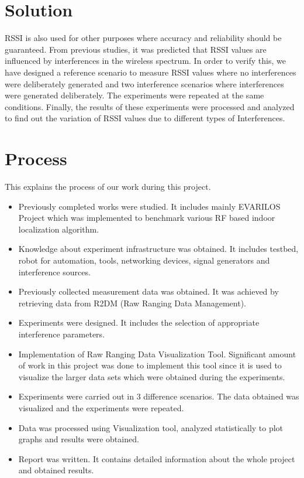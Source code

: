 \documentclass[11pt,a4paper,headinclude,footinclude,chapterprefix=on]{scrreprt}
\begin{document}
\section{Solution} RSSI is also used for other purposes where accuracy and reliability should be guaranteed. From previous studies, it was predicted that RSSI values are influenced by interferences in the wireless spectrum. In order to verify this, we have designed a reference scenario to measure RSSI values where no interferences were deliberately generated and two interference scenarios where interferences were generated deliberately. The experiments were repeated at the same conditions. Finally, the results of these experiments were processed and analyzed to find out the variation of RSSI values due to different types of Interferences.

\section{Process} This explains the process of our work during this project. 
\begin{itemize}
	\item Previously completed works were studied. It includes mainly EVARILOS Project which was implemented to benchmark various RF based indoor localization algorithm. 
	\item Knowledge about experiment infrastructure was obtained. It includes testbed, robot for automation, tools, networking devices, signal generators and interference sources. 
	\item Previously collected measurement data was obtained. It was achieved by retrieving data from R2DM (Raw Ranging Data Management). 
	\item Experiments were designed. It includes the selection of appropriate interference parameters. 
	\item Implementation of Raw Ranging Data Visualization Tool. Significant amount of work in this project was done to implement this tool since it is used to visualize the larger data sets which were obtained during the experiments. 
	\item Experiments were carried out in 3 difference scenarios. The data obtained was visualized and the experiments were repeated. 
	\item Data was processed using Visualization tool, analyzed statistically to plot graphs and results were obtained. 
	\item Report was written. It contains detailed information about the whole project and obtained results. 
\end{itemize}
\end{document}
